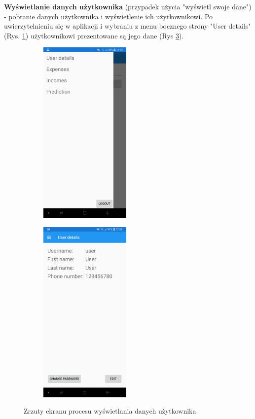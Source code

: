 \textbf{Wyświetlanie danych użytkownika} (przypadek użycia "wyświetl swoje dane") - pobranie danych użytkownika i wyświetlenie ich użytkownikowi. Po uwierzytelnieniu się w aplikacji i wybraniu z menu bocznego strony "User details" (Rys. \ref{hamburger_uzytkownik}) użytkownikowi prezentowane są jego dane (Rys \ref{uzytkownik}).
\begin{figure}[!ht]
	\begin{center}
		\begin{subfigure}[b]{0.3\textwidth}
			\includegraphics[width=1.75in]{img/mobile/menu_boczne.jpg}
			\label{hamburger_uzytkownik}
		\end{subfigure}
		\begin{subfigure}[b]{0.3\textwidth}
			\includegraphics[width=1.75in]{img/mobile/uzytkownik.jpg}
			\label{uzytkownik}
		\end{subfigure}
	\end{center}
	\caption{Zrzuty ekranu procesu wyświetlania danych użytkownika.}
\end{figure}

